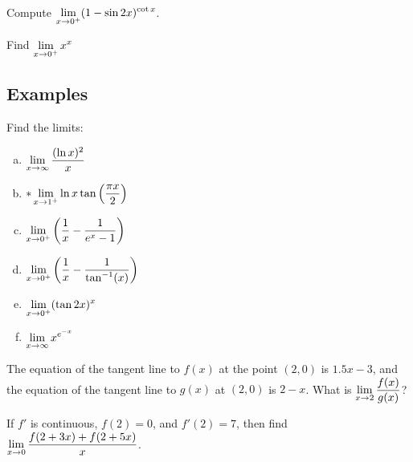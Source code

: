 \documentclass[notes]{subfiles}
\begin{document}
		\begin{rmk}
			\\[40pt]
		\end{rmk}
		
		\begin{ex}
			Compute \(\displaystyle \lim_{x\to 0^+} (1-\sin 2x)^{\cot x}\).
		\end{ex}
			
		\begin{ex}
			Find \(\displaystyle \lim_{x\to 0^+} x^x\)
		\end{ex}
			\newpage
		
	\subsection*{Examples}	
		\begin{ex}
			Find the limits:
			\begin{enumerate}[(a)]
				\item \(\displaystyle \lim_{x\to \infty} \dfrac{(\ln x)^2}{x}\)
					
				\item \(*\displaystyle \lim_{x\to 1^+} \ln x\tan\left( \dfrac{\pi x}{2}\right)\)

				\item \(\displaystyle \lim_{x\to 0^+} \left( \dfrac{1}{x} - \dfrac{1}{e^x-1}\right)\)
					\newpage
					
				\item \(\displaystyle \lim_{x\to 0^+} \left( \dfrac{1}{x} -\dfrac{1}{\tan^{-1}(x)}\right)\)
					
				\item \(\displaystyle \lim_{x\to 0^+} (\tan 2x)^x\)
					
				\item \(\displaystyle \lim_{x\to \infty} x^{e^{-x}}\)
			\end{enumerate}
		\end{ex}	
			\newpage
			
		\begin{ex}
			The equation of the tangent line to \(f(x)\) at the point \((2,0)\) is \(1.5x-3\), and the equation of the tangent line to \(g(x)\) at \((2,0)\) is \(2-x\).  What is \(\displaystyle \lim_{x\to 2} \dfrac{f(x)}{g(x)}\)?  
		\end{ex}
			\vs{1}
			
		\begin{ex}
			If \(f'\) is continuous, \(f(2) = 0\), and \(f'(2) = 7\), then find \(\displaystyle \lim_{x\to 0} \dfrac{f(2+3x) + f(2+5x)}{x}\).
		\end{ex}
			
\end{document}
